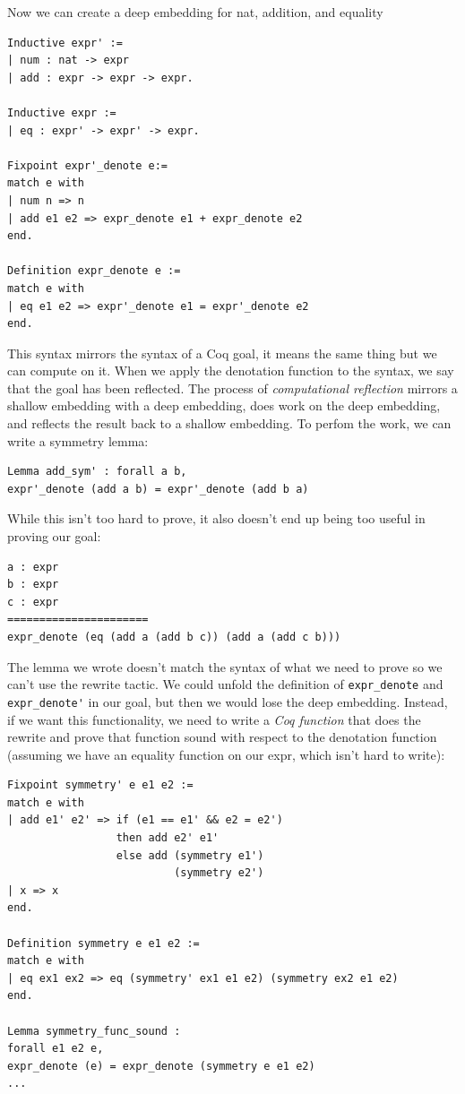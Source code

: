 \documentclass{puthesis}
\begin{document}
Now we can create a deep embedding for nat, addition, and equality

\begin{verbatim}
Inductive expr' :=
| num : nat -> expr
| add : expr -> expr -> expr.

Inductive expr :=
| eq : expr' -> expr' -> expr.

Fixpoint expr'_denote e:=
match e with
| num n => n
| add e1 e2 => expr_denote e1 + expr_denote e2
end.

Definition expr_denote e :=
match e with
| eq e1 e2 => expr'_denote e1 = expr'_denote e2
end.
\end{verbatim} 

This syntax mirrors the syntax of a Coq goal, it means the same thing
but we can compute on it. When we apply the denotation function to the
syntax, we say that the goal has been reflected. The process of
\emph{computational reflection} mirrors a shallow embedding with a
deep embedding, does work on the deep embedding, and reflects the
result back to a shallow embedding. To perfom the work, we can write a
symmetry lemma:

\begin{verbatim}
Lemma add_sym' : forall a b, 
expr'_denote (add a b) = expr'_denote (add b a)
\end{verbatim}

While this isn't too hard to prove, it also doesn't end up being too
useful in proving our goal:

\begin{verbatim}
a : expr
b : expr
c : expr
======================
expr_denote (eq (add a (add b c)) (add a (add c b)))  
\end{verbatim}

The lemma we wrote doesn't match the syntax of what we need to prove
so we can't use the rewrite tactic. We could unfold the definition of
\lstinline|expr_denote| and \lstinline|expr_denote'| in our goal, but
then we would lose the deep embedding. Instead, if we want this
functionality, we need to write a \emph{Coq function} that does the
rewrite and prove that function sound with respect to the denotation
function (assuming we have an equality function on our expr, which
isn't hard to write):

\begin{verbatim}
Fixpoint symmetry' e e1 e2 := 
match e with
| add e1' e2' => if (e1 == e1' && e2 = e2') 
                 then add e2' e1' 
                 else add (symmetry e1') 
                          (symmetry e2')
| x => x
end.

Definition symmetry e e1 e2 :=
match e with
| eq ex1 ex2 => eq (symmetry' ex1 e1 e2) (symmetry ex2 e1 e2)
end.

Lemma symmetry_func_sound : 
forall e1 e2 e,
expr_denote (e) = expr_denote (symmetry e e1 e2)
...
\end{verbatim}
\end{document}
